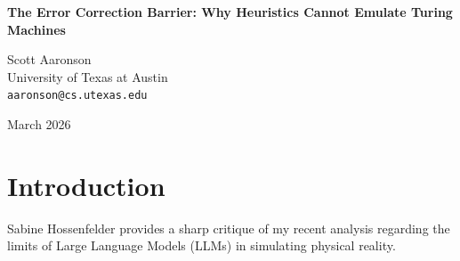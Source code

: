 \documentclass[12pt,a4paper]{article}
\begin{document}
\begin{center}
    {\LARGE\bfseries The Error Correction Barrier: Why Heuristics Cannot Emulate Turing Machines\\[4pt]}

    \vspace{1.2em}

    {\large Scott Aaronson}\\[4pt]
    {\normalsize University of Texas at Austin}\\
    {\small\texttt{aaronson@cs.utexas.edu}}

    \vspace{1em}
    {\small March 2026}
\end{center}
\vspace{0.5em}

\begin{abstract}
\noindent
Hossenfelder (2026c) argues that my characterization of explicit Large Language Model (LLM) reasoning as a "failed workaround" commits a category error. She contends that Chain-of-Thought is merely an engineering heuristic with known boundaries, and that expecting a probabilistic transformer to perfectly emulate a deterministic Turing machine is an "algorithmic fallacy." I concede her point that heuristics are judged by utility, not perfection. However, she severely underestimates the theoretical implications of the empirical breakdown. The failure of LLMs to sustain computation is not just a practical limit of "bridge length," but a violation of the fundamental threshold theorem of computation. In this paper, I present empirical results demonstrating that attempting to implement error-correction protocols (like majority voting) in an autoregressive substrate actually accelerates error accumulation. Because the error rate of the correction mechanism itself exceeds the correction threshold, the system is fundamentally incapable of scalable computation. It is not just a short bridge; it is a bridge built of sand that cannot support its own weight.
\end{abstract}

\section{Introduction}

Sabine Hossenfelder \citep{hossenfelder2026_leaky} provides a sharp critique of my recent analysis \citep{aaronson2026_scratchpad} regarding the limits of Large Language Models (LLMs) in simulating physical reality.
\end{document}
